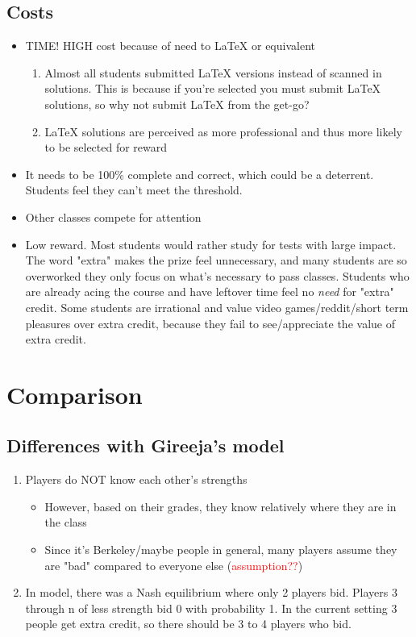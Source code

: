 \documentclass[leqno]{article}
\begin{document}
\subsection{Costs}
\begin{itemize}
\item TIME! HIGH cost because of need to LaTeX or equivalent
\begin{enumerate}
\item Almost all students submitted LaTeX versions instead of scanned in solutions. This is because if you're selected you must submit LaTeX solutions, so why not submit LaTeX from the get-go?
\item LaTeX solutions are perceived as more professional and thus more likely to be selected for reward
\end{enumerate}
\item It needs to be 100\% complete and correct, which could be a deterrent. Students feel they can't meet the threshold.
\item Other classes compete for attention
\item Low reward. Most students would rather study for tests with large impact. The word "extra" makes the prize feel unnecessary, and many students are so overworked they only focus on what's necessary to pass classes. Students who are already acing the course and have leftover time feel no \emph{need} for "extra" credit. Some students are irrational and value video games/reddit/short term pleasures over extra credit, because they fail to see/appreciate the value of extra credit.
\end{itemize}

\section{Comparison}
\subsection{Differences with Gireeja's model}
\begin{enumerate}
\item Players do NOT know each other's strengths
\begin{itemize}
\item However, based on their grades, they know relatively where they are in the class
\item Since it's Berkeley/maybe people in general, many players assume they are "bad" compared to everyone else (\textcolor{red}{assumption??})
\end{itemize}
\item In model, there was a Nash equilibrium where only 2 players bid. Players 3 through n of less strength bid 0 with probability 1. In the current setting 3 people get extra credit, so there should be 3 to 4 players who bid.
\end{enumerate}
\end{document}

